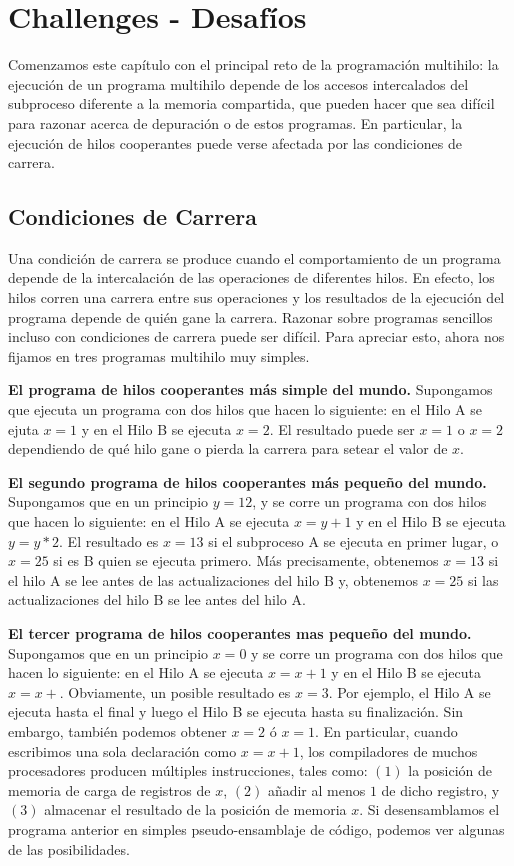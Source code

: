 \documentclass[10pt]{book}
\begin{document}
\section{Challenges - Desafíos}
Comenzamos este capítulo con el principal reto de la programación multihilo: la ejecución de un programa multihilo depende de los accesos intercalados del subproceso diferente a la memoria compartida, que pueden hacer que sea difícil para razonar acerca de depuración o de estos programas. En particular, la ejecución de hilos cooperantes puede verse afectada por las condiciones de carrera.

\subsection{Condiciones de Carrera}
Una condición de carrera se produce cuando el comportamiento de un programa depende de la intercalación de las operaciones de diferentes hilos. En efecto, los hilos corren una carrera entre sus operaciones y los resultados de la ejecución del programa depende de quién gane la carrera. Razonar sobre programas sencillos incluso con condiciones de carrera puede ser difícil. Para apreciar esto, ahora nos fijamos en tres programas multihilo muy simples.

\textbf{El programa de hilos cooperantes más simple del mundo.} Supongamos que ejecuta un programa con dos hilos que hacen lo siguiente: en el Hilo A se ejuta $x = 1$ y en el Hilo B se ejecuta $x = 2$. El resultado puede ser $x = 1$ o $x = 2$ dependiendo de qué hilo gane o pierda la carrera para setear el valor de $x$.

\textbf{El segundo programa de hilos cooperantes más pequeño del mundo.} Supongamos que en un principio $y = 12$, y se corre un programa con dos hilos que hacen lo siguiente: en el Hilo A se ejecuta $x = y + 1$ y en el Hilo B se ejecuta $y = y * 2$. El resultado es $x = 13$ si el subproceso A se ejecuta en primer lugar, o $x = 25$ si es B quien se ejecuta primero. Más precisamente, obtenemos $x = 13$ si el hilo A se lee antes de las actualizaciones del hilo B y, obtenemos $x = 25$ si las actualizaciones del hilo B se lee antes del hilo A.

\textbf{El tercer programa de hilos cooperantes mas pequeño del mundo.} Supongamos que en un principio $x = 0$ y se corre un programa con dos hilos que hacen lo siguiente: en el Hilo A se ejecuta $x = x + 1$ y en el Hilo B se ejecuta $x = x + 
$. Obviamente, un posible resultado es $x = 3$. Por ejemplo, el Hilo A se ejecuta hasta el final y luego el Hilo B se ejecuta hasta su finalización. Sin embargo, también podemos obtener $x = 2$ ó $x = 1$. En particular, cuando escribimos una sola declaración como $x = x + 1$, los compiladores de muchos procesadores producen múltiples instrucciones, tales como: $(1)$ la posición de memoria de carga de registros de $x$, $(2)$ añadir al menos $1$ de dicho registro, y $(3)$ almacenar el resultado de la posición de memoria $x$. Si desensamblamos el programa anterior en simples pseudo-ensamblaje de código, podemos ver algunas de las posibilidades.
\end{document}
